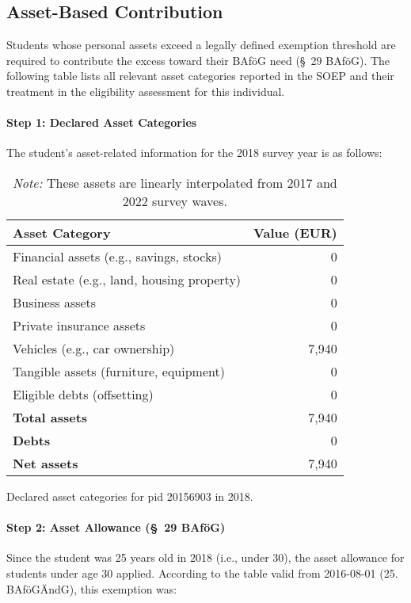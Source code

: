 \subsection{Asset-Based Contribution}

Students whose personal assets exceed a legally defined exemption threshold are required to contribute the excess toward their BAföG need (§~29 BAföG). The following table lists all relevant asset categories reported in the SOEP and their treatment in the eligibility assessment for this individual.

\paragraph{Step 1: Declared Asset Categories}

The student’s asset-related information for the 2018 survey year is as follows:

\begin{table}[H]
\footnotesize
\centering
\begin{tabularx}{\textwidth}{Xr}
\toprule
\textbf{Asset Category} & \textbf{Value (EUR)} \\
\midrule
Financial assets (e.g., savings, stocks) & 0 \\
Real estate (e.g., land, housing property) & 0 \\
Business assets & 0 \\
Private insurance assets & 0 \\
Vehicles (e.g., car ownership) & 7,940 \\
Tangible assets (furniture, equipment) & 0 \\
Eligible debts (offsetting) & 0 \\
\midrule
\textbf{Total assets} & 7,940 \\
\textbf{Debts} & 0 \\
\textbf{Net assets} & 7,940 \\
\bottomrule
\end{tabularx}
\caption{Declared asset categories for pid 20156903 in 2018.}
\caption*{\textit{Note:} These assets are linearly interpolated from 2017 and 2022 survey waves.}
\label{table:bafoeg_declared_assets}
\end{table}

\paragraph{Step 2: Asset Allowance (§~29 BAföG)}

Since the student was 25 years old in 2018 (i.e., under 30), the asset allowance for students under age 30 applied. According to the table valid from 2016-08-01 (25. BAföGÄndG), this exemption was:

